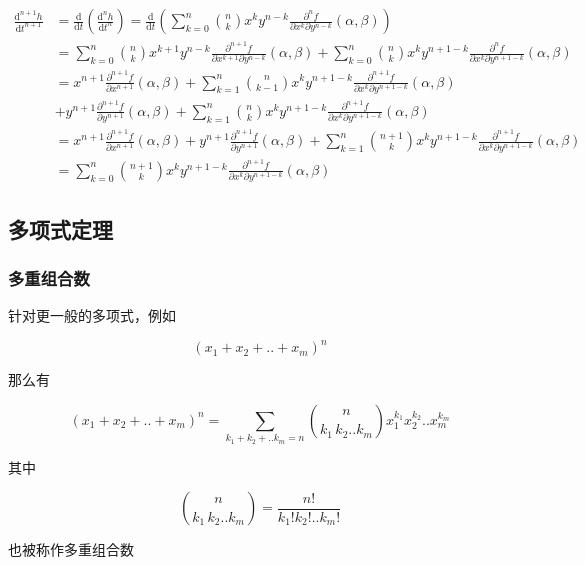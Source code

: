 \documentclass[12pt,a4paper]{ctexart}
\begin{document}
\begin{align*}
\frac{\text{d}^{n+1} h}{\text{d} t^{n+1}} & = \frac{\text{d}}{\text{d} t} \left( \frac{\text{d}^n h}{\text{d} t^n} \right) = \frac{\text{d}}{\text{d} t}\left( \sum_{k=0}^{n} \binom{n}{k} x^{k}y^{n-k}\frac{\partial^n f}{\partial x^{k} \partial y^{n-k}}(\alpha, \beta) \right) \\
&= \sum_{k=0}^{n} \binom{n}{k} x^{k+1}y^{n-k}\frac{\partial^{n+1} f}{\partial x^{k+1} \partial y^{n-k}}(\alpha, \beta) + \sum_{k=0}^{n} \binom{n}{k} x^{k}y^{n+1-k}\frac{\partial^n f}{\partial x^{k} \partial y^{n+1-k}}(\alpha, \beta) \\
&= x^{n+1} \frac{\partial^{n+1} f}{\partial x^{n+1}}(\alpha, \beta) + \sum_{k=1}^{n} \binom{n}{k-1} x^{k}y^{n+1-k}\frac{\partial^{n+1} f}{\partial x^{k} \partial y^{n+1-k}}(\alpha, \beta) \\
& + y^{n+1} \frac{\partial^{n+1} f}{\partial y^{n+1}}(\alpha, \beta) + \sum_{k=1}^{n} \binom{n}{k} x^{k}y^{n+1-k}\frac{\partial^{n+1} f}{\partial x^{k} \partial y^{n+1-k}}(\alpha, \beta) \\
&= x^{n+1} \frac{\partial^{n+1} f}{\partial x^{n+1}}(\alpha, \beta) + y^{n+1} \frac{\partial^{n+1} f}{\partial y^{n+1}}(\alpha, \beta) + \sum_{k=1}^{n} \binom{n+1}{k} x^{k}y^{n+1-k}\frac{\partial^{n+1} f}{\partial x^{k} \partial y^{n+1-k}}(\alpha, \beta) \\
&= \sum_{k=0}^{n} \binom{n+1}{k} x^{k}y^{n+1-k}\frac{\partial^{n+1} f}{\partial x^{k} \partial y^{n+1-k}}(\alpha, \beta)
\end{align*}

\subsection{多项式定理}

\subsubsection{多重组合数}

针对更一般的多项式，例如

\[
(x_1 + x_2 + .. + x_m)^n
\]

那么有

\[
(x_1 + x_2 + .. + x_m)^n = \sum_{k_1 + k_2 + .. k_m = n}\binom{n}{k_1\,k_2..k_m}x_1^{k_1}x_2^{k_2}..x_m^{k_m}
\]

其中

\[
\binom{n}{k_1\,k_2..k_m} = \frac{n!}{k_1!k_2!..k_m!}
\]

也被称作多重组合数
\end{document}
